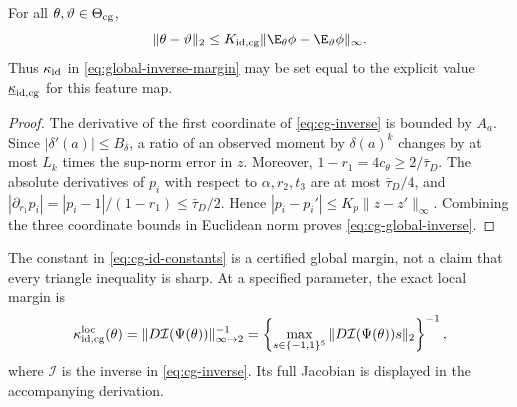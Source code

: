 \begin{proposition}
\label{prop:cg-identification}
For all $\theta,\vartheta\in\Theta_{\rm cg}$,
\begin{equation}
 \|\theta-\vartheta\|_2
 \le K_{\rm id,cg}
 \|\E_\theta\phi-\E_\vartheta\phi\|_\infty.
 \label{eq:cg-global-inverse}
\end{equation}
Thus $\kappa_{\rm id}$ in \eqref{eq:global-inverse-margin} may be set equal
to the explicit value $\underline\kappa_{\rm id,cg}$ for this feature map.
\end{proposition}

\begin{proof}
The derivative of the first coordinate of \eqref{eq:cg-inverse} is bounded by
$A_a$.  Since $|\delta'(a)|\le B_\delta$, a ratio of an observed moment by
$\delta(a)^k$ changes by at most $L_k$ times the sup-norm error in $z$.
Moreover, $1-r_1=4c_\theta\ge2/\bar\tau_D$.  The absolute derivatives of
$p_i$ with respect to $\alpha,r_2,t_3$ are at most $\bar\tau_D/4$, and
$|\partial_{r_1}p_i|=|p_i-1|/(1-r_1)\le\bar\tau_D/2$.  Hence
$|p_i-p_i'|\le K_p\|z-z'\|_\infty$.  Combining the three coordinate bounds
in Euclidean norm proves \eqref{eq:cg-global-inverse}.
\end{proof}

The constant in \eqref{eq:cg-id-constants} is a certified global margin, not
a claim that every triangle inequality is sharp.  At a specified parameter,
the exact local margin is
\[
 \kappa_{\rm id,cg}^{\rm loc}(\theta)
 =\|D\mathcal I(\Psi(\theta))\|_{\infty\to2}^{-1}
 =\left\{
 \max_{s\in\{-1,1\}^5}\|D\mathcal I(\Psi(\theta))s\|_2
 \right\}^{-1},
\]
where $\mathcal I$ is the inverse in \eqref{eq:cg-inverse}.  Its full Jacobian
is displayed in the accompanying derivation.

